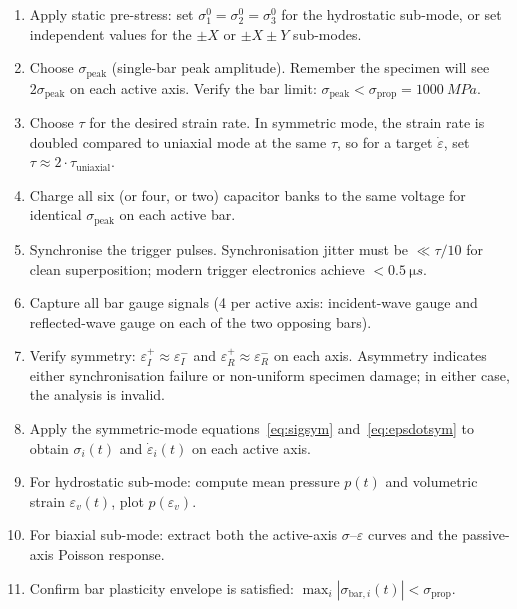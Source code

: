 \documentclass[11pt,a4paper]{article}
\providecommand{\SI}[2]{\qty{#1}{#2}}
\newcommand{\sig}{\sigma}
\newcommand{\eps}{\varepsilon}
\newcommand{\epsdot}{\dot\eps}
\newcommand{\sigprop}{\sig_{\text{prop}}}
\newcommand{\sigpeak}{\sig_{\text{peak}}}
\begin{document}
\begin{stepbox}
\begin{enumerate}[leftmargin=*, itemsep=3pt]
  \item Apply static pre-stress: set $\sig_1^0 = \sig_2^0 = \sig_3^0$ for the
        hydrostatic sub-mode, or set independent values for the $\pm X$ or
        $\pm X \pm Y$ sub-modes.
  \item Choose $\sigpeak$ (single-bar peak amplitude). Remember the specimen
        will see $2 \sigpeak$ on each active axis. Verify the bar limit:
        $\sigpeak < \sigprop = \SI{1000}{MPa}$.
  \item Choose $\tau$ for the desired strain rate. In symmetric mode, the
        strain rate is doubled compared to uniaxial mode at the same $\tau$,
        so for a target $\epsdot$, set $\tau \approx 2 \cdot \tau_{\text{uniaxial}}$.
  \item Charge all six (or four, or two) capacitor banks to the same voltage
        for identical $\sigpeak$ on each active bar.
  \item Synchronise the trigger pulses. Synchronisation jitter must be
        $\ll \tau/10$ for clean superposition; modern trigger electronics
        achieve $< \SI{0.5}{\micro s}$.
  \item Capture all bar gauge signals (4 per active axis: incident-wave gauge
        and reflected-wave gauge on each of the two opposing bars).
  \item Verify symmetry: $\eps_I^+ \approx \eps_I^-$ and
        $\eps_R^+ \approx \eps_R^-$ on each axis. Asymmetry indicates either
        synchronisation failure or non-uniform specimen damage; in either
        case, the analysis is invalid.
  \item Apply the symmetric-mode equations~\eqref{eq:sigsym}
        and~\eqref{eq:epsdotsym} to obtain $\sig_i(t)$ and $\epsdot_i(t)$ on
        each active axis.
  \item For hydrostatic sub-mode: compute mean pressure $p(t)$ and volumetric
        strain $\eps_v(t)$, plot $p(\eps_v)$.
  \item For biaxial sub-mode: extract both the active-axis $\sig$--$\eps$
        curves and the passive-axis Poisson response.
  \item Confirm bar plasticity envelope is satisfied:
        $\max_i |\sig_{\text{bar},i}(t)| < \sigprop$.
\end{enumerate}
\end{stepbox}
\end{document}
